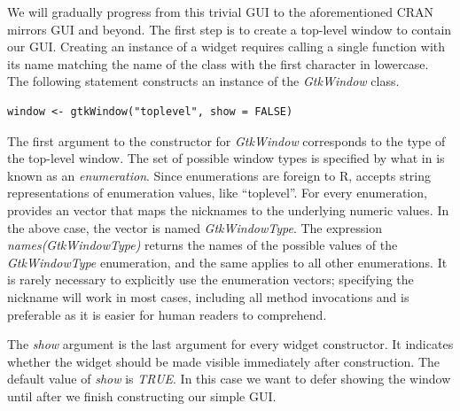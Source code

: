 \documentclass[article]{jss}
\begin{document}
We will gradually 
progress from this trivial GUI to the aforementioned CRAN mirrors GUI
and beyond.
The first step is to create a top-level window to contain our GUI.
Creating an instance of a  widget requires calling a single
function with its name matching the name of the class with the first
character in 
lowercase. The following statement constructs an instance of the
\emph{GtkWindow} class.
\begin{verbatim}
window <- gtkWindow("toplevel", show = FALSE)
\end{verbatim}

The first argument to the constructor for \emph{GtkWindow} corresponds
to the type of the top-level window. The set of possible window types
is specified by what in  is known as an
\emph{enumeration}. Since enumerations are foreign to R, 
accepts string representations of enumeration values, like
``toplevel''. For every  enumeration,  provides
an  vector that maps the nicknames to the underlying
numeric values.  In the above case, the vector is named
\emph{GtkWindowType}. The expression \emph{names(GtkWindowType)} returns the names of the possible values of the \emph{GtkWindowType} enumeration, and the same applies to all other enumerations. It is rarely necessary to explicitly use the
enumeration vectors; specifying the nickname will work in most cases,
including all method invocations and is preferable as it is easier for
human readers to comprehend. 





The \emph{show} argument is the last argument for every widget
constructor. It indicates whether the widget should be made visible
immediately after construction.  The default value of \emph{show} is
\emph{TRUE}. In this case we want to defer showing the window until
after we finish constructing our simple GUI.
\end{document}
